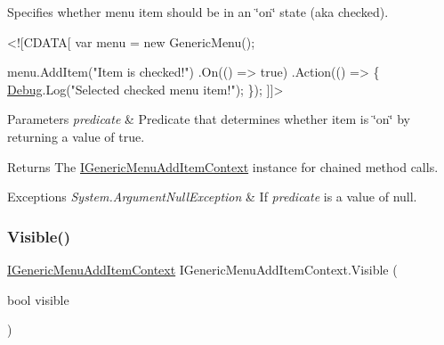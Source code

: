 Specifies whether menu item should be in an \char`\"{}on\char`\"{} state (aka checked). 


\begin{DoxyCode}
<![CDATA[
var menu = \textcolor{keyword}{new} GenericMenu();

menu.AddItem(\textcolor{stringliteral}{"Item is checked!"})
    .On(() => \textcolor{keyword}{true})
    .Action(() => \{
        \hyperlink{namespace_debug}{Debug}.Log(\textcolor{stringliteral}{"Selected checked menu item!"});
    \});
]]>
\end{DoxyCode}
 


\begin{DoxyParams}{Parameters}
{\em predicate} & Predicate that determines whether item is \char`\"{}on\char`\"{} by returning a value of {\ttfamily true}.\\
\hline
\end{DoxyParams}
\begin{DoxyReturn}{Returns}
The \hyperlink{interface_i_generic_menu_add_item_context}{I\+Generic\+Menu\+Add\+Item\+Context} instance for chained method calls. 
\end{DoxyReturn}

\begin{DoxyExceptions}{Exceptions}
{\em System.\+Argument\+Null\+Exception} & If {\itshape predicate}  is a value of {\ttfamily null}. \\
\hline
\end{DoxyExceptions}
\mbox{\label{interface_i_generic_menu_add_item_context_a997ba7515e31c40ecaae9a5a4a5e8b1c}} 
\subsubsection{\texorpdfstring{Visible()}{Visible()}\hspace{0.1cm}{\footnotesize\ttfamily [1/2]}}
{\footnotesize\ttfamily \hyperlink{interface_i_generic_menu_add_item_context}{I\+Generic\+Menu\+Add\+Item\+Context} I\+Generic\+Menu\+Add\+Item\+Context.\+Visible (\begin{DoxyParamCaption}\item[{bool}]{visible }\end{DoxyParamCaption})}



